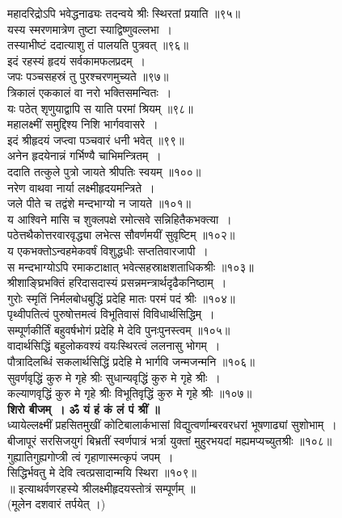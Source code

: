 \documentclass[twoside,top=1.7cm, bottom=1.7cm, outer=1cm,landscape, inner=1.5cm,a5paper,]{book}
\begin{document}
\begin{center}
महादरिद्रोऽपि भवेद्धनाढ्यः तदन्वये श्रीः स्थिरतां प्रयाति ॥९५॥\\[10pt]
यस्य स्मरणमात्रेण तुष्टा स्याद्विष्णुवल्लभा~।\\
तस्याभीष्टं ददात्याशु तं पालयति पुत्रवत् ॥९६॥\\[10pt]
\newpage
इदं रहस्यं हृदयं सर्वकामफलप्रदम्~।\\
जपः पञ्चसहस्रं तु पुरश्चरणमुच्यते ॥९७॥\\[10pt]
त्रिकालं एककालं वा नरो भक्तिसमन्वितः~।\\
यः पठेत् शृणुयाद्वापि स याति परमां श्रियम् ॥९८॥\\[10pt]
महालक्ष्मीं समुद्दिश्य निशि भार्गववासरे~।\\
इदं श्रीहृदयं जप्त्वा पञ्चवारं धनी भवेत् ॥९९॥\\[10pt]
अनेन हृदयेनान्नं गर्भिण्यै चाभिमन्त्रितम्~।\\
ददाति तत्कुले पुत्रो जायते श्रीपतिः स्वयम् ॥१००॥\\[10pt]
\newpage
नरेण वाथवा नार्या लक्ष्मीहृदयमन्त्रिते~।\\
जले पीते च तद्वंशे मन्दभाग्यो न जायते ॥१०१॥\\[10pt]
य आश्विने मासि च शुक्लपक्षे रमोत्सवे सन्निहितैकभक्त्या~।\\
पठेत्तथैकोत्तरवारवृद्ध्या लभेत्स सौवर्णमयीं सुवृष्टिम् ॥१०२॥\\[10pt]
य एकभक्तोऽन्वहमेकवर्षं विशुद्धधीः सप्ततिवारजापी~।\\
स मन्दभाग्योऽपि रमाकटाक्षात् भवेत्सहस्राक्षशताधिकश्रीः ॥१०३॥\\[10pt]
श्रीशाङ्घ्रिभक्तिं हरिदासदास्यं प्रसन्नमन्त्रार्थदृढैकनिष्ठाम्~।\\
गुरोः स्मृतिं निर्मलबोधबुद्धिं प्रदेहि मातः परमं पदं श्रीः ॥१०४॥\\[10pt]
\newpage
पृथ्वीपतित्वं पुरुषोत्तमत्वं विभूतिवासं विविधार्थसिद्धिम्~।\\
सम्पूर्णकीर्तिं बहुवर्षभोगं प्रदेहि मे देवि पुनःपुनस्त्वम् ॥१०५॥\\[10pt]
वादार्थसिद्धिं बहुलोकवश्यं वयःस्थिरत्वं ललनासु भोगम्~।\\
पौत्रादिलब्धिं सकलार्थसिद्धिं प्रदेहि मे भार्गवि जन्मजन्मनि ॥१०६॥\\[10pt]
सुवर्णवृद्धिं कुरु मे गृहे श्रीः सुधान्यवृद्धिं कुरु मे गृहे श्रीः~।\\
कल्याणवृद्धिं कुरु मे गृहे श्रीः विभूतिवृद्धिं कुरु मे गृहे श्रीः ॥१०७॥\\[10pt]
{\bfseries शिरो बीजम्~। ॐ यं हं कं लं पं श्रीं ॥}\\[10pt]
ध्यायेल्लक्ष्मीं प्रहसितमुखीं कोटिबालार्कभासां
विद्युत्वर्णाम्बरवरधरां भूषणाढ्यां सुशोभाम्~।\\
बीजापूरं सरसिजयुगं बिभ्रतीं स्वर्णपात्रं
भर्त्रा युक्तां मुहुरभयदां मह्यमप्यच्युतश्रीः ॥१०८॥\\[10pt]
गुह्यातिगुह्यगोप्त्री त्वं गृहाणास्मत्कृपं जपम्~।\\
सिद्धिर्भवतु मे देवि त्वत्प्रसादान्मयि स्थिरा ॥१०९॥\\[10pt]
॥ इत्याथर्वणरहस्ये श्रीलक्ष्मीहृदयस्तोत्रं सम्पूर्णम् ॥\\[10pt]
(मूलेन दशवारं तर्पयेत् ।)
\end{center}
\end{document}
